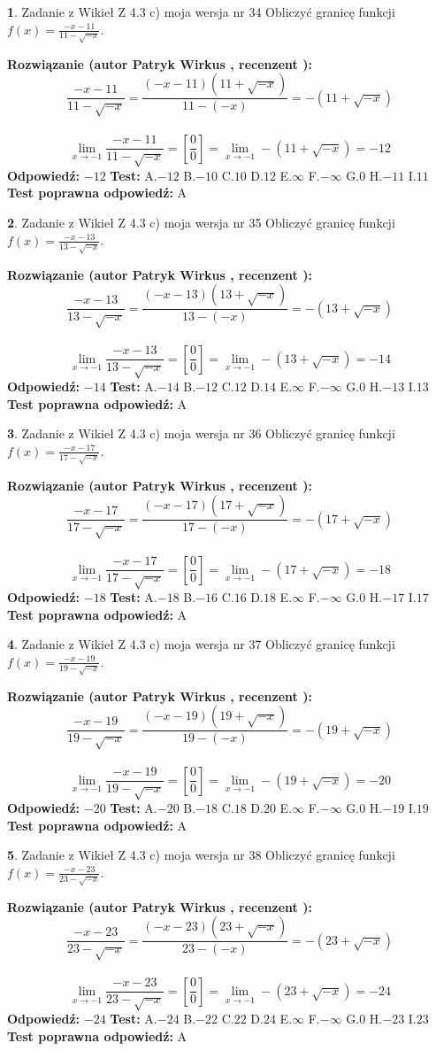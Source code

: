 \documentclass[12pt, a4paper]{article}
\theoremstyle{definition} %
\newtheorem{zad}{}
\newcommand{\zadStart}[1]{\begin{zad}#1\newline}
\newcommand{\zadStop}{\end{zad}}
\newcommand{\rozwStart}[2]{\noindent \textbf{Rozwiązanie (autor #1 , recenzent #2): }\newline}
\newcommand{\rozwStop}{\newline}
\newcommand{\odpStart}{\noindent \textbf{Odpowiedź:}\newline}
\newcommand{\odpStop}{\newline}
\newcommand{\testStart}{\noindent \textbf{Test:}\newline}
\newcommand{\testStop}{\newline}
\newcommand{\kluczStart}{\noindent \textbf{Test poprawna odpowiedź:}\newline}
\newcommand{\kluczStop}{\newline}
\begin{document}
\zadStart{Zadanie z Wikieł Z 4.3 c) moja wersja nr 34}
Obliczyć granicę funkcji $f(x)=\frac{-x-11}{11-\sqrt{-x}}$.
\zadStop
\rozwStart{Patryk Wirkus}{}
$$\frac{-x-11}{11-\sqrt{-x}}=\frac{(-x-11)(11+\sqrt{-x})}{11-(-x)}=-(11+\sqrt{-x})$$
\\
$$\lim\limits_{x\to-1}\frac{-x-11}{11-\sqrt{-x}}=[\frac{0}{0}]=\lim\limits_{x\to-1}-(11+\sqrt{-x}) =-12$$
\rozwStop
\odpStart
$-12$
\odpStop
\testStart
A.$-12$
B.$-10$
C.$10$
D.$12$
E.$\infty$
F.$-\infty$
G.$0$
H.$-11$
I.$11$
\testStop
\kluczStart
A
\kluczStop



\zadStart{Zadanie z Wikieł Z 4.3 c) moja wersja nr 35}
Obliczyć granicę funkcji $f(x)=\frac{-x-13}{13-\sqrt{-x}}$.
\zadStop
\rozwStart{Patryk Wirkus}{}
$$\frac{-x-13}{13-\sqrt{-x}}=\frac{(-x-13)(13+\sqrt{-x})}{13-(-x)}=-(13+\sqrt{-x})$$
\\
$$\lim\limits_{x\to-1}\frac{-x-13}{13-\sqrt{-x}}=[\frac{0}{0}]=\lim\limits_{x\to-1}-(13+\sqrt{-x}) =-14$$
\rozwStop
\odpStart
$-14$
\odpStop
\testStart
A.$-14$
B.$-12$
C.$12$
D.$14$
E.$\infty$
F.$-\infty$
G.$0$
H.$-13$
I.$13$
\testStop
\kluczStart
A
\kluczStop



\zadStart{Zadanie z Wikieł Z 4.3 c) moja wersja nr 36}
Obliczyć granicę funkcji $f(x)=\frac{-x-17}{17-\sqrt{-x}}$.
\zadStop
\rozwStart{Patryk Wirkus}{}
$$\frac{-x-17}{17-\sqrt{-x}}=\frac{(-x-17)(17+\sqrt{-x})}{17-(-x)}=-(17+\sqrt{-x})$$
\\
$$\lim\limits_{x\to-1}\frac{-x-17}{17-\sqrt{-x}}=[\frac{0}{0}]=\lim\limits_{x\to-1}-(17+\sqrt{-x}) =-18$$
\rozwStop
\odpStart
$-18$
\odpStop
\testStart
A.$-18$
B.$-16$
C.$16$
D.$18$
E.$\infty$
F.$-\infty$
G.$0$
H.$-17$
I.$17$
\testStop
\kluczStart
A
\kluczStop



\zadStart{Zadanie z Wikieł Z 4.3 c) moja wersja nr 37}
Obliczyć granicę funkcji $f(x)=\frac{-x-19}{19-\sqrt{-x}}$.
\zadStop
\rozwStart{Patryk Wirkus}{}
$$\frac{-x-19}{19-\sqrt{-x}}=\frac{(-x-19)(19+\sqrt{-x})}{19-(-x)}=-(19+\sqrt{-x})$$
\\
$$\lim\limits_{x\to-1}\frac{-x-19}{19-\sqrt{-x}}=[\frac{0}{0}]=\lim\limits_{x\to-1}-(19+\sqrt{-x}) =-20$$
\rozwStop
\odpStart
$-20$
\odpStop
\testStart
A.$-20$
B.$-18$
C.$18$
D.$20$
E.$\infty$
F.$-\infty$
G.$0$
H.$-19$
I.$19$
\testStop
\kluczStart
A
\kluczStop



\zadStart{Zadanie z Wikieł Z 4.3 c) moja wersja nr 38}
Obliczyć granicę funkcji $f(x)=\frac{-x-23}{23-\sqrt{-x}}$.
\zadStop
\rozwStart{Patryk Wirkus}{}
$$\frac{-x-23}{23-\sqrt{-x}}=\frac{(-x-23)(23+\sqrt{-x})}{23-(-x)}=-(23+\sqrt{-x})$$
\\
$$\lim\limits_{x\to-1}\frac{-x-23}{23-\sqrt{-x}}=[\frac{0}{0}]=\lim\limits_{x\to-1}-(23+\sqrt{-x}) =-24$$
\rozwStop
\odpStart
$-24$
\odpStop
\testStart
A.$-24$
B.$-22$
C.$22$
D.$24$
E.$\infty$
F.$-\infty$
G.$0$
H.$-23$
I.$23$
\testStop
\kluczStart
A
\kluczStop
\end{document}
